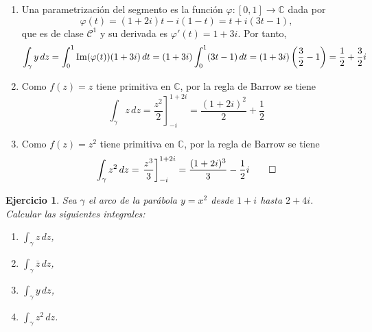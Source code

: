 \documentclass[11pt]{report}
\makeatletter
\renewenvironment{proof}[1][\proofname]{\par
  \pushQED{\qed}%
  \normalfont \topsep\z@skip %
  \trivlist
  \item[\hskip\labelsep
        \itshape
    #1\@addpunct{.}]\ignorespaces
}{%
  \popQED\endtrivlist\@endpefalse
}
\newcommand{\C}{\mathbb C}
\newtheorem{exercise}{Ejercicio}
\makeatother
\begin{document}
\begin{proof}
\hfill
\begin{enumerate}
    \item
    Una parametrización del segmento es la función $\varphi \colon [0,1] \to \C$ dada por \[\varphi(t) = (1+2i)t-i(1-t) = t+i(3t-1),\] que es de clase $\mathcal{C}^1$ y su derivada es $\varphi'(t) = 1+3i$. Por tanto,
    \[ \int_\gamma y\, dz = \int_0^1 \textup{Im}(\varphi(t))(1+3i) \, dt = (1+3i)\int_0^1(3t-1) \, dt = (1+3i)\left(\frac{3}{2}-1\right) = \frac{1}{2}+\frac{3}{2}i\]
    \item Como $f(z)=z$ tiene primitiva en $\C$, por la regla de Barrow se tiene
    \[\int_\gamma z \, dz = \left.\frac{z^2}{2}\right]_{-i}^{1+2i} = \frac{(1+2i)^2}{2}+\frac{1}{2}\]
    \item Como $f(z)=z^2$ tiene primitiva en $\C$, por la regla de Barrow se tiene
    \[\int_\gamma z^2 \, dz =\left.\frac{z^3}{3}\right]_{-i}^{1+2i} = \frac{(1+2i)^3}{3}-\frac{1}{2}i \qedhere\]
\end{enumerate}
\end{proof}

\begin{exercise}
Sea $\gamma$ el arco de la parábola $y = x^2$ desde $1+i$ hasta $2+4i$. Calcular las siguientes integrales:
\begin{multicols}{4}
\begin{enumerate}
\centering
    \item $\displaystyle \int_\gamma z \, dz$,
    \item $\displaystyle \int_\gamma \overline{z} \, dz$,
    \item $\displaystyle \int_\gamma y \, dz$,
    \item $\displaystyle \int_\gamma z^2 \, dz$.
\end{enumerate}
\end{multicols}
\end{exercise}
\end{document}
